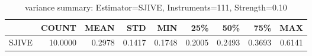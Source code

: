 \begin{table}[ht]
\centering
\caption{variance summary: Estimator=SJIVE, Instruments=111, Strength=0.10}
\begin{tabular}{lrrrrrrrr}
\toprule
 & COUNT & MEAN & STD & MIN & 25\% & 50\% & 75\% & MAX \\
\midrule
SJIVE & 10.0000 & 0.2978 & 0.1417 & 0.1748 & 0.2005 & 0.2493 & 0.3693 & 0.6141 \\
\bottomrule
\end{tabular}
\end{table}

